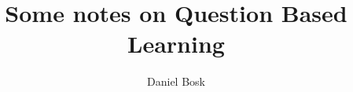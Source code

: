 \documentclass{article}
\begin{document}
\title{%
  Some notes on Question Based Learning
}
\author{Daniel Bosk}

\maketitle




\printbibliography
\end{document}

